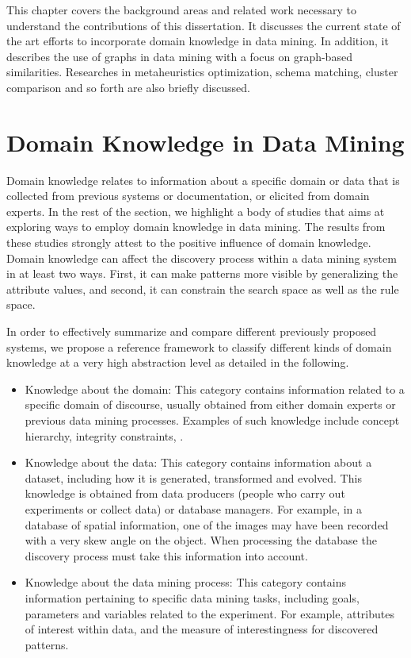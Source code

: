 This chapter covers the background areas and related work necessary to understand the contributions of this dissertation. It discusses the current state of the art efforts to incorporate domain knowledge in data mining. In addition, it describes the use of graphs in data mining with a focus on graph-based similarities. Researches in metaheuristics optimization, schema matching, cluster comparison and so forth are also briefly discussed.

\section{Domain Knowledge in Data Mining}
Domain knowledge relates to information about a specific domain or data that is collected from previous systems or documentation, or elicited from domain experts. In the rest of the section, we highlight a body of studies that aims at exploring ways to employ domain knowledge in data mining. The results from these studies strongly attest to the positive influence of domain knowledge. Domain knowledge can affect the discovery process within a data mining system in at least two ways. First, it can make patterns more visible by generalizing the attribute values, and second, it can constrain the search space as well as the rule space.

In order to effectively summarize and compare different previously proposed systems, we propose a reference framework to classify different kinds of domain knowledge at a very high abstraction level as detailed in the following.

\begin{itemize}
\item	Knowledge about the domain: This category contains information related to a specific domain of discourse, usually obtained from either domain experts or previous data mining processes. Examples of such knowledge include concept hierarchy, integrity constraints, \etc.
\item	Knowledge about the data: This category contains information about a dataset, including how it is generated, transformed and evolved. This knowledge is obtained from data producers (people who carry out experiments or collect data) or database managers. For example, in a database of spatial information, one of the images may have been recorded with a very skew angle on the object. When processing the database the discovery process must take this information into account.
\item	Knowledge about the data mining process: This category contains information pertaining to specific data mining tasks, including goals, parameters and variables related to the experiment. For example, attributes of interest within data, and the measure of interestingness for discovered patterns.
\end{itemize}

